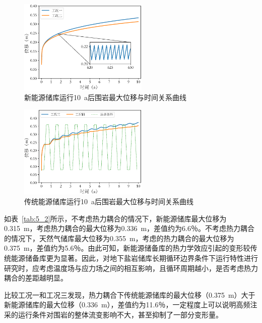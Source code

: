 \begin{figure}[ht!]
    \centering
    \includegraphics[width=0.55\textwidth]{img/chap5/位移/新能源储库10年最大位移与时间关系.pdf}
    \caption{新能源储库运行\SI{10}{a}后围岩最大位移与时间关系曲线}
    \label{fig:5_12}
\end{figure}

\begin{figure}[ht!]
    \centering
    \includegraphics[width=0.55\textwidth]{img/chap5/位移/传统能源储库10年最大位移与时间的关系.pdf}
    \caption{传统能源储库运行\SI{10}{a}后围岩最大位移与时间关系曲线}
    \label{fig:5_13}
\end{figure}

如表~\ref{tab:5_2}所示，不考虑热力耦合的情况下，新能源储库最大位移为\SI{0.315}{m}，考虑热力耦合的最大位移为\SI{0.336}{m}，差值约为6.6％。不考虑热力耦合的情况下，天然气储库最大位移为\SI{0.355}{m}，考虑的热力耦合的最大位移为\SI{0.375}{m}，差值约为5.6％。由此可知，新能源储备库的热力学效应引起的变形较传统能源储备库更为显著。因此，对地下盐岩储库长期循环边界条件下运行特性进行研究时，应考虑温度场与应力场之间的相互影响，且循环周期越小，是否考虑热力耦合的差距越明显。

比较工况一和工况三发现，热力耦合下传统能源储库的最大位移（\SI{0.375}{m}）大于新能源储库的最大位移（\SI{0.336}{m}），差值约为11.6％，一定程度上可以说明高频注采的运行条件对围岩的整体流变影响不大，甚至抑制了一部分变形量。

